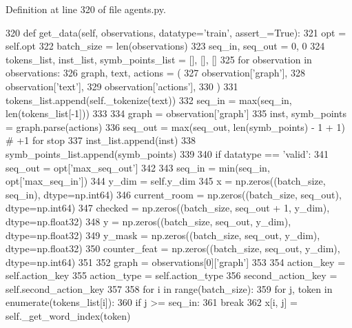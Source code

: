 Definition at line 320 of file agents.\+py.


\begin{DoxyCode}
320     \textcolor{keyword}{def }get\_data(self, observations, datatype='train', assert\_=True):
321         opt = self.opt
322         batch\_size = len(observations)
323         seq\_in, seq\_out = 0, 0
324         tokens\_list, inst\_list, symb\_points\_list = [], [], []
325         \textcolor{keywordflow}{for} observation \textcolor{keywordflow}{in} observations:
326             graph, text, actions = (
327                 observation[\textcolor{stringliteral}{'graph'}],
328                 observation[\textcolor{stringliteral}{'text'}],
329                 observation[\textcolor{stringliteral}{'actions'}],
330             )
331             tokens\_list.append(self.\_tokenize(text))
332             seq\_in = max(seq\_in, len(tokens\_list[-1]))
333 
334             graph = observation[\textcolor{stringliteral}{'graph'}]
335             inst, symb\_points = graph.parse(actions)
336             seq\_out = max(seq\_out, len(symb\_points) - 1 + 1)  \textcolor{comment}{# +1 for stop}
337             inst\_list.append(inst)
338             symb\_points\_list.append(symb\_points)
339 
340         \textcolor{keywordflow}{if} datatype == \textcolor{stringliteral}{'valid'}:
341             seq\_out = opt[\textcolor{stringliteral}{'max\_seq\_out'}]
342 
343         seq\_in = min(seq\_in, opt[\textcolor{stringliteral}{'max\_seq\_in'}])
344         y\_dim = self.y\_dim
345         x = np.zeros((batch\_size, seq\_in), dtype=np.int64)
346         current\_room = np.zeros((batch\_size, seq\_out), dtype=np.int64)
347         checked = np.zeros((batch\_size, seq\_out + 1, y\_dim), dtype=np.float32)
348         y = np.zeros((batch\_size, seq\_out, y\_dim), dtype=np.float32)
349         y\_mask = np.zeros((batch\_size, seq\_out, y\_dim), dtype=np.float32)
350         counter\_feat = np.zeros((batch\_size, seq\_out, y\_dim), dtype=np.int64)
351 
352         graph = observations[0][\textcolor{stringliteral}{'graph'}]
353 
354         action\_key = self.action\_key
355         action\_type = self.action\_type
356         second\_action\_key = self.second\_action\_key
357 
358         \textcolor{keywordflow}{for} i \textcolor{keywordflow}{in} range(batch\_size):
359             \textcolor{keywordflow}{for} j, token \textcolor{keywordflow}{in} enumerate(tokens\_list[i]):
360                 \textcolor{keywordflow}{if} j >= seq\_in:
361                     \textcolor{keywordflow}{break}
362                 x[i, j] = self.\_get\_word\_index(token)

\end{DoxyCode}
